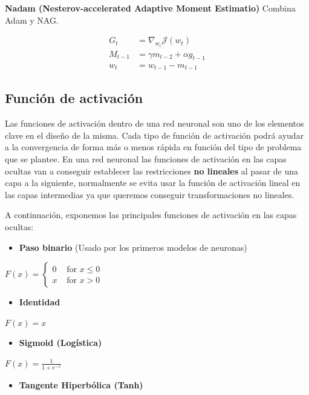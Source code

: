 \documentclass[
  a4paper,
  DIV=11,
  numbers=noendperiod]{scrreprt}
\providecommand{\tightlist}{%
  \setlength{\itemsep}{0pt}\setlength{\parskip}{0pt}}\usepackage{longtable,booktabs,array}
\begin{document}
\textbf{Nadam (Nesterov-accelerated Adaptive Moment Estimatio)} Combina
Adam y NAG.

\[
\begin{aligned} G_t & =\nabla_{w_t} \mathcal{J}\left(w_t\right) \\ M_{t-1} & =\gamma m_{t-2}+\alpha g_{t-1} \\ w_t & =w_{t-1}-m_{t-1}\end{aligned}
\]

\subsection{Función de activación}\label{funciuxf3n-de-activaciuxf3n}

Las funciones de activación dentro de una red neuronal son uno de los
elementos clave en el diseño de la misma. Cada tipo de función de
activación podrá ayudar a la convergencia de forma más o menos rápida en
función del tipo de problema que se plantee. En una red neuronal las
funciones de activación en las capas ocultas van a conseguir establecer
las restricciones \textbf{no lineales} al pasar de una capa a la
siguiente, normalmente se evita usar la función de activación lineal en
las capas intermedias ya que queremos conseguir transformaciones no
lineales.

A continuación, exponemos las principales funciones de activación en las
capas ocultas:

\begin{itemize}
\tightlist
\item
  \textbf{Paso binario} (Usado por los primeros modelos de neuronas)
\end{itemize}

\(F(x)= \begin{cases}0 & \text { for } x \leq 0 \\ x & \text { for } x>0\end{cases}\)

\begin{itemize}
\tightlist
\item
  \textbf{Identidad}
\end{itemize}

\(F(x)=x\)

\begin{itemize}
\tightlist
\item
  \textbf{Sigmoid (Logística)}
\end{itemize}

\(F(x)=\frac{1}{1+e^{-x}}\)

\begin{itemize}
\tightlist
\item
  \textbf{Tangente Hiperbólica (Tanh)}
\end{itemize}
\end{document}
